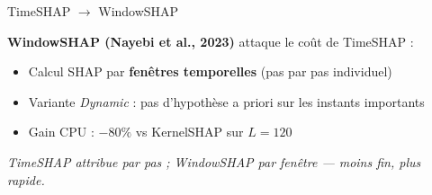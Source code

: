 \documentclass[10pt]{beamer}
\begin{document}
\begin{frame}{TimeSHAP $\to$ WindowSHAP}
  \begin{plusbox}
    \textbf{WindowSHAP (Nayebi et al., 2023)} attaque le coût de TimeSHAP :
    \begin{itemize}
      \item Calcul SHAP par \textbf{fenêtres temporelles} (pas par pas individuel)
      \item Variante \emph{Dynamic} : pas d'hypothèse a priori sur les instants importants
      \item Gain CPU : $-80\%$ vs KernelSHAP sur $L=120$
    \end{itemize}
    \vspace{2pt}\centering
    \emph{TimeSHAP attribue par pas ; WindowSHAP par fenêtre — moins fin, plus rapide.}
  \end{plusbox}
\end{frame}
\end{document}
